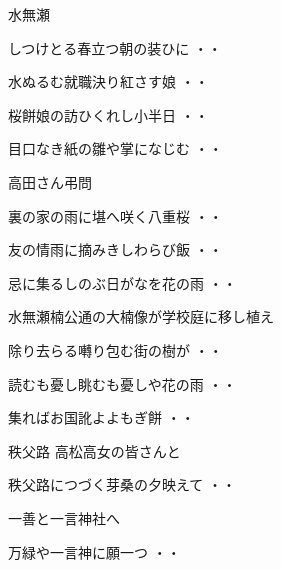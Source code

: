 \vspace{0.6cm}
水無瀬
\begin{shiika}しつけとる春立つ朝の装ひに
\hfill{・・}\end{shiika}
\begin{shiika}水ぬるむ就職決り紅さす娘
\hfill{・・}\end{shiika}
\begin{shiika}桜餅娘の訪ひくれし小半日
\hfill{・・}\end{shiika}
\begin{shiika}目口なき紙の雛や掌になじむ
\hfill{・・}\end{shiika}
\vspace{0.6cm}
高田さん弔問
\begin{shiika}裏の家の雨に堪へ咲く八重桜
\hfill{・・}\end{shiika}
\begin{shiika}友の情雨に摘みきしわらび飯
\hfill{・・}\end{shiika}
\begin{shiika}忌に集るしのぶ日がなを花の雨
\hfill{・・}\end{shiika}
\vspace{0.6cm}
水無瀬楠公通の大楠像が学校庭に移し植え
\begin{shiika}除り去らる囀り包む街の樹が
\hfill{・・}\end{shiika}
\begin{shiika}読むも憂し眺むも憂しや花の雨
\hfill{・・}\end{shiika}
\begin{shiika}集ればお国訛よよもぎ餅
\hfill{・・}\end{shiika}
\vspace{0.6cm}
秩父路 高松高女の皆さんと
\begin{shiika}秩父路につづく芽桑の夕映えて
\hfill{・・}\end{shiika}
\vspace{0.6cm}
一善と一言神社へ
\begin{shiika}万緑や一言神に願一つ
\hfill{・・}\end{shiika}
